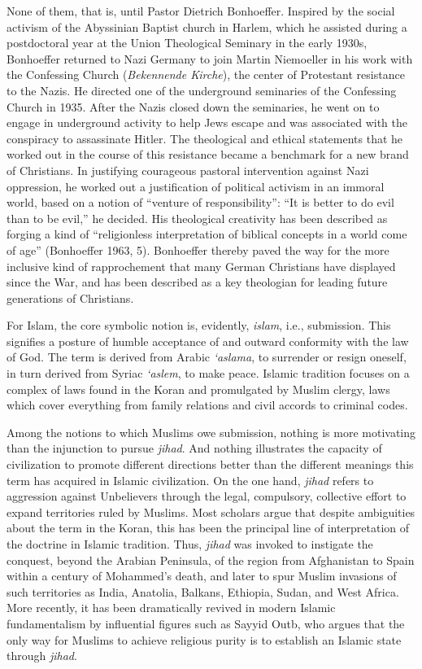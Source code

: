 None of them, that is, until Pastor Dietrich Bonhoeffer. Inspired by the social activism of the Abyssinian Baptist church in Harlem, which he assisted during a postdoctoral year at the Union Theological Seminary in the early 1930s, Bonhoeffer returned to Nazi Germany to join Martin Niemoeller in his work with the Confessing Church (\emph{Bekennende Kirche}), the center of Protestant resistance to the Nazis. He directed one of the underground seminaries of the Confessing Church in 1935. After the Nazis closed down the seminaries, he went on to engage in underground activity to help Jews escape and was associated with the conspiracy to assassinate Hitler. The theological and ethical statements that he worked out in the course of this resistance became a benchmark for a new brand of Christians. In justifying courageous pastoral intervention against Nazi oppression, he worked out a justification of political activism in an immoral world, based on a notion of ``venture of responsibility'': ``It is better to do evil than to be evil,'' he decided. His theological creativity has been described as forging a kind of ``religionless interpretation of biblical concepts in a world come of age'' (Bonhoeffer 1963, 5). Bonhoeffer thereby paved the way for the more inclusive kind of rapprochement that many German Christians have displayed since the War, and has been described as a key theologian for leading future generations of Christians.

For Islam, the core symbolic notion is, evidently, \emph{islam}, i.e., submission. This signifies a posture of humble acceptance of and outward conformity with the law of God. The term is derived from Arabic \emph{`aslama}, to surrender or resign oneself, in turn derived from Syriac \emph{`aslem}, to make peace. Islamic tradition focuses on a complex of laws found in the Koran and promulgated by Muslim clergy, laws which cover everything from family relations and civil accords to criminal codes.

Among the notions to which Muslims owe submission, nothing is more motivating than the injunction to pursue \emph{jihad}. And nothing illustrates the capacity of civilization to promote different directions better than the different meanings this term has acquired in Islamic civilization. On the one hand, \emph{jihad} refers to aggression against Unbelievers through the legal, compulsory, collective effort to expand territories ruled by Muslims. Most scholars argue that despite ambiguities about the term in the Koran, this has been the principal line of interpretation of the doctrine in Islamic tradition. Thus, \emph{jihad} was invoked to instigate the conquest, beyond the Arabian Peninsula, of the region from Afghanistan to Spain within a century of Mohammed's death, and later to spur Muslim invasions of such territories as India, Anatolia, Balkans, Ethiopia, Sudan, and West Africa. More recently, it has been dramatically revived in modern Islamic fundamentalism by influential figures such as Sayyid Outb, who argues that the only way for Muslims to achieve religious purity is to establish an Islamic state through \emph{jihad}.

